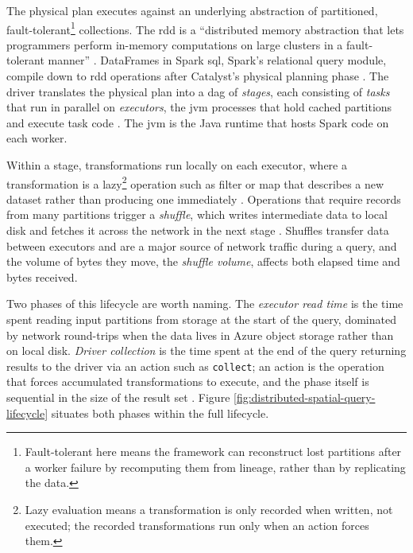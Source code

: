 The physical plan executes against an underlying abstraction of partitioned, fault-tolerant\footnote{Fault-tolerant here means the framework can reconstruct lost partitions after a worker failure by recomputing them from lineage, rather than by replicating the data.} collections. The \acrfull{rdd} is a \enquote{distributed memory abstraction that lets programmers perform in-memory computations on large clusters in a fault-tolerant manner} \parencite{zaharia2012_resilient_distributed_datasets}. DataFrames in Spark \acrshort{sql}, Spark's relational query module, compile down to \acrshort{rdd} operations after Catalyst's physical planning phase \parencite{armbrust2015_spark_sql_relational_data_processing}. The driver translates the physical plan into a \acrfull{dag} of \emph{stages}, each consisting of \emph{tasks} that run in parallel on \emph{executors}, the \acrfull{jvm} processes that hold cached partitions and execute task code \parencite{zaharia2012_resilient_distributed_datasets, spark2024_cluster_mode_overview}. The \acrshort{jvm} is the Java runtime that hosts Spark code on each worker.

Within a stage, transformations run locally on each executor, where a transformation is a lazy\footnote{Lazy evaluation means a transformation is only recorded when written, not executed; the recorded transformations run only when an action forces them.} operation such as filter or map that describes a new dataset rather than producing one immediately \parencite{zaharia2012_resilient_distributed_datasets}. Operations that require records from many partitions trigger a \emph{shuffle}, which writes intermediate data to local disk and fetches it across the network in the next stage \parencite{zaharia2012_resilient_distributed_datasets, spark2024_job_scheduling}. Shuffles transfer data between executors and are a major source of network traffic during a query, and the volume of bytes they move, the \emph{shuffle volume}, affects both elapsed time and bytes received.

Two phases of this lifecycle are worth naming. The \emph{executor read time} is the time spent reading input partitions from storage at the start of the query, dominated by network round-trips when the data lives in Azure object storage rather than on local disk. \emph{Driver collection} is the time spent at the end of the query returning results to the driver via an action such as \texttt{collect}; an action is the operation that forces accumulated transformations to execute, and the phase itself is sequential in the size of the result set \parencite{zaharia2012_resilient_distributed_datasets}. Figure \ref{fig:distributed-spatial-query-lifecycle} situates both phases within the full lifecycle.

